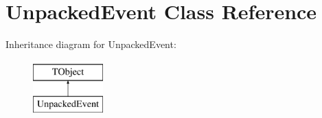 \hypertarget{class_unpacked_event}{\section{Unpacked\-Event Class Reference}
\label{class_unpacked_event}
}
Inheritance diagram for Unpacked\-Event\-:\begin{figure}[H]
\begin{center}
\leavevmode
\includegraphics[height=2.000000cm]{class_unpacked_event}
\end{center}
\end{figure}
